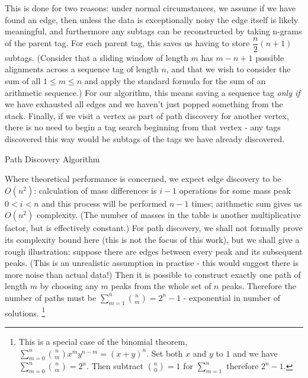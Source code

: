 \documentclass{l4proj}
\begin{document}
This is done for two reasons: under normal circumstances, we assume if we have found an edge, then unless the data is exceptionally noisy the edge itself is likely meaningful, and furthermore any subtags can be reconstructed by taking n-grams of the parent tag. For each parent tag, this saves us having to store \(\dfrac{n}{2}(n+1)\) subtags. (Consider that a sliding window of length \(m\) has \(m-n+1\) possible alignments across a sequence tag of length \(n\), and that we wish to consider the sum of all \(1 \leq m \leq n\) and apply the standard formula for the sum of an arithmetic sequence.) For our algorithm, this means saving a sequence tag \textit{only if} we have exhausted all edges and we haven't just popped something from the stack. Finally, if we visit a vertex as part of path discovery for another vertex, there is no need to begin a tag search beginning from that vertex - any tags discovered this way would be subtags of the tags we have already discovered.

\begin{algorithm}
    \DontPrintSemicolon

\caption{Path Discovery Algorithm}\label{alg:pathdisc}
\end{algorithm}

Where theoretical performance is concerned, we expect edge discovery to be \(O(n^2)\): calculation of mass differences is \(i-1\) operations for some mass peak \(0 < i < n\) and this process will be performed \(n-1\) times; arithmetic sum gives us \(O(n^2)\) complexity. (The number of masses in the table is another multiplicative factor, but is effectively constant.) For path discovery, we shall not formally prove its complexity bound here (this is not the focus of this work), but we shall give a rough illustration: suppose there are edges between every peak and its subsequent peaks. (This is an unrealistic assumption in practise - this would suggest there is more noise than actual data!) Then it is possible to construct exactly one path of length \(m\) by choosing any \(m\) peaks from the whole set of \(n\) peaks. Therefore the number of paths must be \(\sum_{m=1}^n\binom{n}{m} = 2^{n} - 1\) - exponential in number of solutions. \footnote{This is a special case of the binomial theorem, \(\sum_{m=0}^{n}\binom{n}{m}x^{m}y^{n-m} = (x+y)^n\). Set both \(x\) and \(y\) to \(1\) and we have \(\sum_{m=0}^{n}{\binom{n}{m}} = 2^n\). Then subtract \(\binom{n}{0} = 1\) for \(\sum_{m=1}^{n}\) therefore \(2^n - 1\).} 
\end{document}
